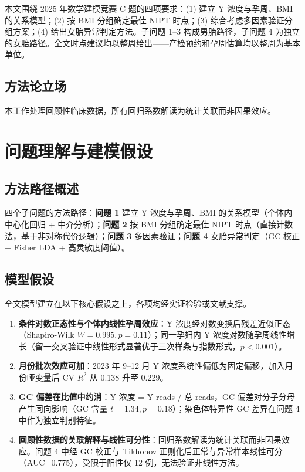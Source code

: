 \documentclass{mcm-paper}
\begin{document}
本文围绕 2025 年数学建模竞赛 C 题的四项要求：(1) 建立 Y 浓度与孕周、BMI 的关系模型；(2) 按 BMI 分组确定最佳 NIPT 时点；(3) 综合考虑多因素验证分组方案；(4) 给出女胎异常判定方法。子问题 1--3 构成男胎路径，子问题 4 为独立的女胎路径。全文时点建议均以整周给出——产检预约和孕周估算均以整周为基本单位。

\subsection{方法论立场}

本工作处理回顾性临床数据，所有回归系数解读为统计关联而非因果效应。

\newpage

\section{问题理解与建模假设}

\subsection{方法路径概述}

四个子问题的方法路径：\textbf{问题 1} 建立 Y 浓度与孕周、BMI 的关系模型（个体内中心化回归 + 中介分析）；\textbf{问题 2} 按 BMI 分组确定最佳 NIPT 时点（直接计数法，基于非对称代价逻辑）；\textbf{问题 3} 多因素验证；\textbf{问题 4} 女胎异常判定（GC 校正 + Fisher LDA + 高灵敏度阈值）。

\subsection{模型假设}

全文模型建立在以下核心假设之上，各项均经实证检验或文献支撑。

\begin{enumerate}
    \item \textbf{条件对数正态性与个体内线性孕周效应}：Y 浓度经对数变换后残差近似正态（Shapiro-Wilk $W=0.995, p=0.11$）；同一孕妇内 Y 浓度对数随孕周线性增长（留一交叉验证中线性形式显著优于三次样条与指数形式，$p<0.001$）。

    \item \textbf{月份批次效应可加}：2023 年 9--12 月 Y 浓度系统性偏低为固定偏移，加入月份哑变量后 CV $R^2$ 从 0.138 升至 0.229。

    \item \textbf{GC 偏差在比值中约消}：Y 浓度 = Y reads / 总 reads，GC 偏差对分子分母产生同向影响（GC 含量 $t=1.34, p=0.18$）；染色体特异性 GC 差异在问题 4 中作为独立判别特征。

    \item \textbf{回顾性数据的关联解释与线性可分性}：回归系数解读为统计关联而非因果效应。问题 4 中经 GC 校正与 Tikhonov 正则化后正常与异常样本线性可分（AUC=0.775），受限于阳性仅 12 例，无法验证非线性方法。
\end{enumerate}
\end{document}
